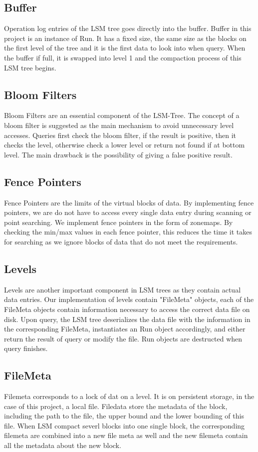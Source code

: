 \documentclass[sigconf]{acmart}
\begin{document}
    \subsection{Buffer}
    Operation log entries of the LSM tree goes directly into the buffer. Buffer in this project is an instance of Run. It has a fixed size, the same size as the blocks on the first level of the tree and it is the first data to look into when query. When the buffer if full, it is swapped into level 1 and the compaction process of this LSM tree begins.

    \subsection{Bloom Filters}
    Bloom Filters are an essential component of the LSM-Tree. The concept of a bloom filter is suggested as the main mechanism to avoid unnecessary level accesses. Queries first check the bloom filter, if the result is positive, then it checks the level, otherwise check a lower level or return not found if at bottom level. The main drawback is the possibility of giving a false positive result.

    \subsection{Fence Pointers}
    Fence Pointers are the limits of the virtual blocks of data. By implementing fence pointers, we are do not have to access every single data entry during scanning or point searching. We implement fence pointers in the form of zonemaps. By checking the min/max values in each fence pointer, this reduces the time it takes for searching as we ignore blocks of data that do not meet the requirements.

    \subsection{Levels}
    Levels are another important component in LSM trees as they contain actual data entries. Our implementation of levels contain "FileMeta" objects, each of the FileMeta objects contain information necessary to access the correct data file on disk. Upon query, the LSM tree deserializes the data file with the information in the corresponding FileMeta, instantiates an Run object accordingly, and either return the result of query or modify the file. Run objects are destructed when query finishes.

    \subsection{FileMeta}
    Filemeta corresponds to a lock of dat on a level. It is on persistent storage, in the case of this project, a local file. Filedata store the metadata of the block, including the path to the file, the upper bound and the lower bounding of this file. When LSM compact severl blocks into one single block, the corresponding filemeta are combined into a new file meta as well and the new filemeta contain all the metadata about the new block.
\end{document}
